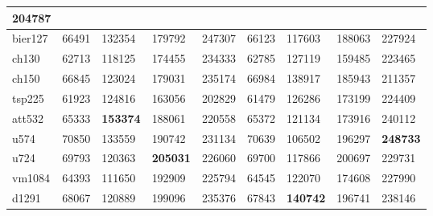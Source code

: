 \begin{table}[htb]
{\begin{tabular}{|l|llll|llll|}
    204787 \\ \hline
  bier127 &
    \multicolumn{1}{l|}{66491} &
    \multicolumn{1}{l|}{132354} &
    \multicolumn{1}{l|}{179792} &
    247307 &
    \multicolumn{1}{l|}{66123} &
    \multicolumn{1}{l|}{117603} &
    \multicolumn{1}{l|}{188063} &
    227924 \\ \hline
  ch130 &
    \multicolumn{1}{l|}{62713} &
    \multicolumn{1}{l|}{118125} &
    \multicolumn{1}{l|}{174455} &
    234333 &
    \multicolumn{1}{l|}{62785} &
    \multicolumn{1}{l|}{127119} &
    \multicolumn{1}{l|}{159485} &
   223465 \\ \hline
  ch150 &
    \multicolumn{1}{l|}{66845} &
    \multicolumn{1}{l|}{123024} &
    \multicolumn{1}{l|}{179031} &
    235174 &
    \multicolumn{1}{l|}{66984} &
    \multicolumn{1}{l|}{138917} &
    \multicolumn{1}{l|}{185943} &
    211357 \\ \hline
  tsp225 &
    \multicolumn{1}{l|}{61923} &
    \multicolumn{1}{l|}{124816} &
    \multicolumn{1}{l|}{163056} &
    202829 &
    \multicolumn{1}{l|}{61479} &
    \multicolumn{1}{l|}{126286} &
    \multicolumn{1}{l|}{173199} &
    224409 \\ \hline
  att532 &
    \multicolumn{1}{l|}{65333} &
    \multicolumn{1}{l|}{\textbf{153374}} &
    \multicolumn{1}{l|}{188061} &
    220558 &
    \multicolumn{1}{l|}{65372} &
    \multicolumn{1}{l|}{121134} &
    \multicolumn{1}{l|}{173916} &
    240112 \\ \hline
  u574 &
    \multicolumn{1}{l|}{70850} &
    \multicolumn{1}{l|}{133559} &
    \multicolumn{1}{l|}{190742} &
    231134 &
    \multicolumn{1}{l|}{70639} &
    \multicolumn{1}{l|}{106502} &
    \multicolumn{1}{l|}{196297} &
    \textbf{248733} \\ \hline
  u724 &
    \multicolumn{1}{l|}{69793} &
    \multicolumn{1}{l|}{120363} &
    \multicolumn{1}{l|}{\textbf{205031}} &
    226060 &
    \multicolumn{1}{l|}{69700} &
    \multicolumn{1}{l|}{117866} &
    \multicolumn{1}{l|}{200697} &
    229731 \\ \hline
  vm1084 &
    \multicolumn{1}{l|}{64393} &
    \multicolumn{1}{l|}{111650} &
    \multicolumn{1}{l|}{192909} &
    225794 &
    \multicolumn{1}{l|}{64545} &
    \multicolumn{1}{l|}{122070} &
    \multicolumn{1}{l|}{174608} &
    227990 \\ \hline
  d1291 &
    \multicolumn{1}{l|}{68067} &
    \multicolumn{1}{l|}{120889} &
    \multicolumn{1}{l|}{199096} &
    235376 &
    \multicolumn{1}{l|}{67843} &
    \multicolumn{1}{l|}{\textbf{140742}} &
    \multicolumn{1}{l|}{196741} &
    238146 \\ \hline
  \end{tabular}%
  }
\end{table}

